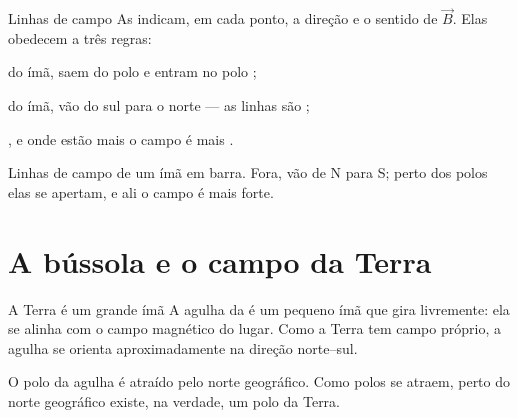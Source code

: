 \documentclass{notaaula}
\newcommand{\pedaco}[3]{%
  \pgfmathsetmacro{\pxm}{(#1+#2)/2}%
  \fill[naCoral] (#1,{#3-0.23}) rectangle (\pxm,{#3+0.23});
  \fill[naAzul]  (\pxm,{#3-0.23}) rectangle (#2,{#3+0.23});
  \node[font=\tiny\bfseries, text=naFundo] at ({(#1+\pxm)/2},#3) {N};
  \node[font=\tiny\bfseries, text=naFundo] at ({(\pxm+#2)/2},#3) {S};}
\begin{document}
\begin{copiar}{Linhas de campo}
 As  indicam, em cada ponto, a
direção e o sentido de $\vec{B}$. Elas obedecem a três regras:
\begin{itens}
\item {} do ímã, saem do polo  e entram no polo
      ;
\item {} do ímã, vão do sul para o norte — as linhas são
      ;
\item {}, e onde estão mais  o campo é mais
      .
\end{itens}
\end{copiar}

\begin{figuranota}{Linhas de campo de um ímã em barra. Fora, vão de N para S;
perto dos polos elas se apertam, e ali o campo é mais forte.}
\end{figuranota}

\section{A bússola e o campo da Terra}

\begin{copiar}{A Terra é um grande ímã}
 A agulha da  é um pequeno ímã que gira livremente:
ela se alinha com o campo magnético do lugar. Como a Terra tem campo próprio,
a agulha se orienta aproximadamente na direção norte–sul.

 O polo  da agulha é atraído pelo norte
geográfico. Como polos  se atraem, perto do norte geográfico
existe, na verdade, um polo  da Terra.
\end{copiar}
\end{document}
